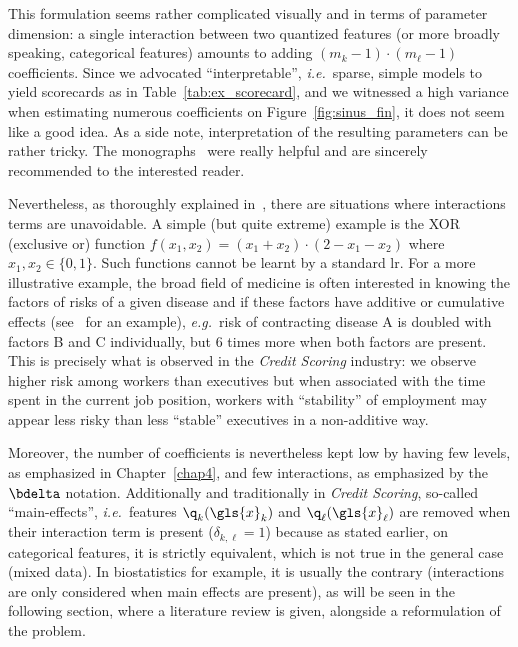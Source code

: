 This formulation seems rather complicated visually and in terms of parameter dimension: a single interaction between two quantized features (or more broadly speaking, categorical features) amounts to adding $(m_k - 1) \cdot (m_\ell - 1)$ coefficients. Since we advocated ``interpretable'', \textit{i.e.}\ sparse, simple models to yield scorecards as in Table~\ref{tab:ex_scorecard}, and we witnessed a high variance when estimating numerous coefficients on Figure~\ref{fig:sinus_fin}, it does not seem like a good idea. As a side note, interpretation of the resulting parameters can be rather tricky. The monographs~\cite{jaccard2003interaction,james2001interaction} were really helpful and are sincerely recommended to the interested reader.

Nevertheless, as thoroughly explained in~\cite{berry2010testing}, there are situations where interactions terms are unavoidable. A simple (but quite extreme) example is the XOR (exclusive or) function $f(x_1,x_2) = (x_1 + x_2)\cdot(2 - x_1 - x_2)$ where $x_1,x_2 \in \{0,1\}$. Such functions cannot be learnt by a standard \gls{lr}. For a more illustrative example, the broad field of medicine is often interested in knowing the factors of risks of a given disease and if these factors have additive or cumulative effects (see~\cite{morgan2014adversity} for an example), \textit{e.g.}\ risk of contracting disease A is doubled with factors B and C individually, but 6 times more when both factors are present. This is precisely what is observed in the \textit{Credit Scoring} industry: we observe higher risk among workers than executives but when associated with the time spent in the current job position, workers with ``stability'' of employment may appear less risky than less ``stable'' executives in a non-additive way.

Moreover, the number of coefficients is nevertheless kept low by having few levels, as emphasized in Chapter~\ref{chap4}, and few interactions, as emphasized by the $\bdelta$ notation. Additionally and traditionally in \textit{Credit Scoring}, so-called ``main-effects'', \textit{i.e.}\ features $\q_k(\gls{x}_k)$ and $\q_\ell(\gls{x}_\ell)$ are removed when their interaction term is present ($\delta_{k,\ell} = 1$) because as stated earlier, on categorical features, it is strictly equivalent, which is not true in the general case (mixed data). In biostatistics for example, it is usually the contrary (interactions are only considered when main effects are present), as will be seen in the following section, where a literature review is given, alongside a reformulation of the problem.

